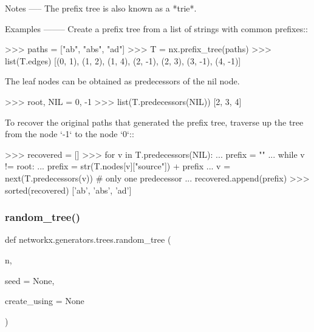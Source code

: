\begin{DoxyVerb}
Notes
-----
The prefix tree is also known as a *trie*.


Examples
--------
Create a prefix tree from a list of strings with common prefixes::

    >>> paths = ["ab", "abs", "ad"]
    >>> T = nx.prefix_tree(paths)
    >>> list(T.edges)
    [(0, 1), (1, 2), (1, 4), (2, -1), (2, 3), (3, -1), (4, -1)]

The leaf nodes can be obtained as predecessors of the nil node.

    >>> root, NIL = 0, -1
    >>> list(T.predecessors(NIL))
    [2, 3, 4]

To recover the original paths that generated the prefix tree,
traverse up the tree from the node `-1` to the node `0`::

    >>> recovered = []
    >>> for v in T.predecessors(NIL):
    ...     prefix = ""
    ...     while v != root:
    ...         prefix = str(T.nodes[v]["source"]) + prefix
    ...         v = next(T.predecessors(v))  # only one predecessor
    ...     recovered.append(prefix)
    >>> sorted(recovered)
    ['ab', 'abs', 'ad']
\end{DoxyVerb}
 \mbox{\label{namespacenetworkx_1_1generators_1_1trees_a8423414dc7c03c951d99e44d69566d93}} 
\subsubsection{\texorpdfstring{random\+\_\+tree()}{random\_tree()}}
{\footnotesize\ttfamily def networkx.\+generators.\+trees.\+random\+\_\+tree (\begin{DoxyParamCaption}\item[{}]{n,  }\item[{}]{seed = {\ttfamily None},  }\item[{}]{create\+\_\+using = {\ttfamily None} }\end{DoxyParamCaption})}

